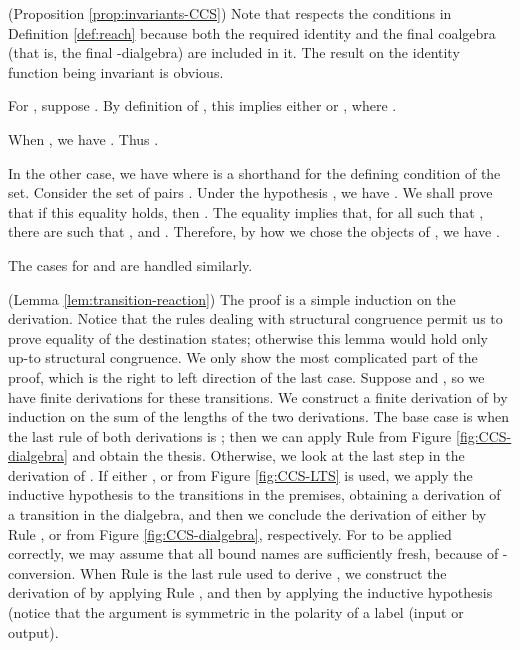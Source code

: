 \documentclass[orivec]{llncs}
\newcommand{\proend}{\medskip}
\renewenvironment{proof}{\begin{pro}}{\proend\end{pro}}
\begin{document}
\begin{proof}(Proposition \ref{prop:invariants-CCS})
	Note that  respects the conditions in Definition \ref{def:reach} because both the required identity and the final coalgebra (that is, the final -dialgebra) are included in it. The result on the identity function being invariant is obvious. 
	
	For , suppose . By definition of , this implies either  or , where .
	
	When , we have . Thus . 
	
	In the other case, we have  where  is a shorthand for the defining condition of the set. Consider the set of pairs .  Under the hypothesis , we have . We shall prove that if this equality holds, then . The equality implies that, for all  such that , there are  such that , and . Therefore, by how we chose the objects of , we have . 
	
	The cases for  and  are handled similarly.
\end{proof}

\begin{proof}(Lemma \ref{lem:transition-reaction}) The proof is a simple induction on the derivation. Notice that the rules dealing with structural congruence permit us to prove equality of the destination states; otherwise this lemma would hold only up-to structural congruence. We only show the most complicated part of the proof, which is the right to left direction of the last case. Suppose  and , so we have finite derivations for these transitions. We construct a finite derivation of  by induction on the sum of the lengths of the two derivations. The base case is when the last rule of both derivations is ; then we can apply Rule  from Figure \ref{fig:CCS-dialgebra} and obtain the thesis. Otherwise, we look at the last step in the derivation of . If either ,  or  from Figure \ref{fig:CCS-LTS} is used, we apply the inductive hypothesis to the transitions in the premises, obtaining a derivation of a transition in the 
dialgebra, and then we conclude the derivation of  either by Rule ,  or  from Figure \ref{fig:CCS-dialgebra}, respectively. For  to be applied correctly, we may assume that all bound names are sufficiently fresh, because of -conversion. When Rule  is the last rule used to derive , we construct the derivation of  by applying Rule , and then by applying the inductive hypothesis (notice that the argument is symmetric in the polarity of a label (input or output).
\end{proof} 
\end{document}

